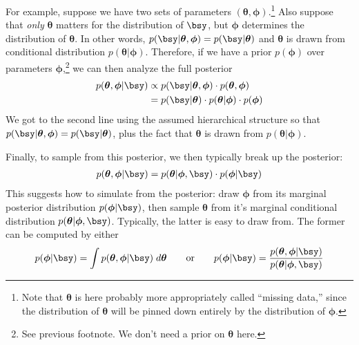 \documentclass[12pt]{article}
\theoremstyle{plain}
\theoremstyle{definition}
\theoremstyle{remark}
\newcommand{\bstheta}{\boldsymbol{\theta}}
\newcommand{\bsphi}{\boldsymbol{\phi}}
\begin{document}
For example, suppose we have two sets of parameters
$(\bstheta,\bsphi)$.\footnote{%
  Note that $\bstheta$ is here probably more appropriately called
  ``missing data,'' since the distribution of $\bstheta$ will be pinned
  down entirely by the distribution of $\bsphi$.
}
Also suppose that \emph{only} $\bstheta$ matters for the distribution of
$\bsy$, but $\bsphi$ determines the distribution of $\bstheta$.
In other words, $p(\bsy|\bstheta,\bsphi)=p(\bsy|\bstheta)$ and
$\bstheta$ is drawn from conditional distribution $p(\bstheta|\bsphi)$.
Therefore, if we have a prior $p(\bsphi)$ over parameters
$\bsphi$,\footnote{%
  See previous footnote.
  We don't need a prior on $\bstheta$ here.
}
we can then analyze the full posterior
\begin{align}
   p(\bstheta,\bsphi|\bsy)
   &\propto
   p(\bsy|\bstheta,\bsphi) \cdot p(\bstheta,\bsphi)
   \\
   &= p(\bsy|\bstheta) \cdot p(\bstheta|\bsphi)\cdot p(\bsphi)
   \label{heirarch}
\end{align}
We got to the second line using the assumed hierarchical structure so
that $p(\bsy|\bstheta,\bsphi)=p(\bsy|\bstheta)$, plus the fact that
$\bstheta$ is drawn from $p(\bstheta|\bsphi)$.

Finally, to sample from this posterior, we then typically break up the
posterior:
\begin{align*}
  p(\bstheta, \bsphi|\bsy)
  = p(\bstheta | \bsphi, \bsy)\cdot p(\bsphi | \bsy)
\end{align*}
This suggests how to simulate from the posterior: draw $\bsphi$ from
its marginal posterior distribution $p(\bsphi|\bsy)$, then sample
$\bstheta$ from it's marginal conditional distribution
$p(\bstheta | \bsphi, \bsy)$. Typically, the latter is easy to draw
from. The former can be computed by either
\begin{align*}
  p(\bsphi|\bsy)
  = \int p(\bstheta, \bsphi | \bsy) \; d\bstheta
  \qquad \text{or} \qquad
  p(\bsphi | \bsy) = \frac{p(\bstheta, \bsphi | \bsy)}{ p(\bstheta | \bsphi, \bsy)}
\end{align*}

\end{document}
